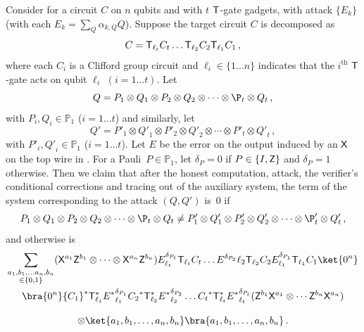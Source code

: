 \documentclass{toc}
\newcommand{\tgate}{{\sf T}}
\newcommand{\xgate}{{\sf X}}
\newcommand{\zgate}{{\sf Z}}
\newcommand{\ketbra}[2]{\ket{#1}\bra{#2}}			%
\newcommand{\egoketbra}[1]{\ketbra{#1}{#1}}			%
\begin{document}
\begin{lemma}\label{lem:acceptance-computation-induction}
Consider  for a circuit $C$ on $n$ qubits and with $t$ $\tgate$-gate gadgets, with attack $\{E_k\}$ (with each $E_k = \sum_{Q} \alpha_{k,Q} Q$).
Suppose the target circuit  $C$ is decomposed as
\begin{equation}
  C =  \tgate_{\ell_t} C_t \ldots \tgate_{\ell_2} C_2 \tgate_{\ell_1} C_1\,,
\end{equation}
where each $C_i$ is a Clifford group circuit and
$\ell_i \in \{1\ldots n\}$ indicates that the $i^{\text{th}}$
$\tgate$-gate acts on qubit $\ell_i$ $ (i=1\ldots t)$.
%
Let
\begin{equation}
  Q=P_1\otimes Q_1 \otimes P_2 \otimes Q_2 \otimes \cdots \otimes \P_t \otimes Q_t\,,
\end{equation}
with $P_i, Q_i \in \mathbb{P}_1$ ($ i =1 \ldots t$) and similarly, let
\begin{equation}
  Q'={P'}_1\otimes {Q'}_1 \otimes {P'}_2 \otimes {Q'}_2 \otimes \cdots
  \otimes {P'}_t \otimes {Q'}_t\,,
\end{equation}
with ${P'}_i, {Q'}_i \in \mathbb{P}_1$ ($ i =1 \ldots t$).  Let $E$ be
the error on the output induced by an $\xgate$ on the top wire in
.  For a
Pauli~$P \in \mathbb{P}_1$, let $\delta_{P} = 0$ if
$P \in \{I, \zgate\} $ and $\delta_{P} = 1$ otherwise.  Then we claim
that after the honest computation, attack, the verifier's conditional
corrections and tracing out of the auxiliary system, the term of the
system corresponding to the attack $(Q, Q')$ is~$0$ if
\begin{equation}
  P_1\otimes Q_1 \otimes P_2 \otimes Q_2 \otimes \cdots \otimes \P_t
\otimes Q_t \neq P'_1\otimes Q'_1 \otimes P'_2 \otimes Q'_2 \otimes
\cdots \otimes \P'_t \otimes Q'_t\,,
\end{equation}
and otherwise is%
\begin{multline}
\label{eqn:computation-run-claim}
\sum_{\substack{a_1,b_1, \ldots a_n, b_n \\ \in \{0,1\}}} (\xgate^{a_1}\zgate^{b_1} \otimes \cdots \otimes \xgate^{a_n}\zgate^{b_n})  E^{\delta_{P_t}}_{\ell_t}    \tgate_{\ell_t} C_t \ldots  E^{\delta_{P_2}}{\ell_2}    \tgate_{\ell_2} C_2  E^{\delta_{P_1}}_{\ell_1}  \tgate_{\ell_1} C_1 \ket{0^n}\\
 \bra{0^n} {C_1}^* \tgate^*_{\ell_1}   {E^*}^{\delta_{P_1}}_{\ell_1} {C_2}^*   \tgate^*_{\ell_2}   {E^*}^{\delta_{P_2}}_{\ell_2} \ldots   {C_t}^* \tgate^*_{\ell_t}   {E^*}^{\delta_{P_t}}_{\ell_t}  (\zgate^{b_1} \xgate^{a_1}\otimes \cdots \zgate^{b_n} \xgate^{a_n})\\[2ex]
 \otimes \egoketbra{a_1, b_1, \ldots ,a_n, b_n}\,.
\end{multline}
\end{lemma}
\end{document}
